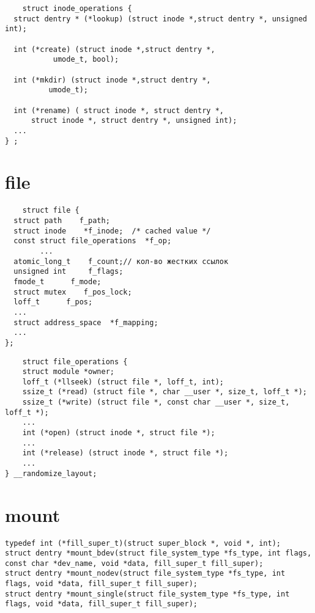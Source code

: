 \begin{lstlisting}
    struct inode_operations {
  struct dentry * (*lookup) (struct inode *,struct dentry *, unsigned int);
  
  int (*create) (struct inode *,struct dentry *,
           umode_t, bool);

  int (*mkdir) (struct inode *,struct dentry *,
          umode_t);
  
  int (*rename) ( struct inode *, struct dentry *,
      struct inode *, struct dentry *, unsigned int);
  ...
} ;
\end{lstlisting}

\section*{file}

\begin{lstlisting}
    struct file {
  struct path    f_path;
  struct inode    *f_inode;  /* cached value */
  const struct file_operations  *f_op;
        ...
  atomic_long_t    f_count;// кол-во жестких ссылок
  unsigned int     f_flags;
  fmode_t      f_mode;
  struct mutex    f_pos_lock;
  loff_t      f_pos;
  ...
  struct address_space  *f_mapping;
  ...
};
\end{lstlisting}

\begin{lstlisting}
	struct file_operations {
	struct module *owner;
	loff_t (*llseek) (struct file *, loff_t, int);
	ssize_t (*read) (struct file *, char __user *, size_t, loff_t *);
	ssize_t (*write) (struct file *, const char __user *, size_t, loff_t *);
	...
	int (*open) (struct inode *, struct file *);
	...
	int (*release) (struct inode *, struct file *);
	...
} __randomize_layout;
\end{lstlisting}

\section*{mount}

\begin{lstlisting}
typedef int (*fill_super_t)(struct super_block *, void *, int);
struct dentry *mount_bdev(struct file_system_type *fs_type, int flags, const char *dev_name, void *data, fill_super_t fill_super);
struct dentry *mount_nodev(struct file_system_type *fs_type, int flags, void *data, fill_super_t fill_super);
struct dentry *mount_single(struct file_system_type *fs_type, int flags, void *data, fill_super_t fill_super);
\end{lstlisting}

